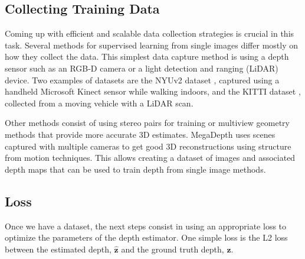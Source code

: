 \subsection{Collecting Training Data}

Coming up with efficient and scalable data collection strategies is crucial in this task. Several methods for supervised learning from single images differ mostly on how they collect the data. This simplest data capture method is using a depth sensor such as an RGB-D camera or a light detection and ranging (LiDAR) device.
Two examples of datasets are the NYUv2 dataset \cite{SilbermanECCV12}, captured using a handheld Microsoft Kinect sensor while walking indoors, and the KITTI dataset \cite{Geiger2013}, collected from a moving vehicle with a LiDAR scan.

Other methods consist of using stereo pairs for training \cite{Xian2018} or multiview geometry methods that provide more accurate 3D estimates. MegaDepth \cite{MegaDepthLi18} uses scenes captured with multiple cameras to get good 3D reconstructions using structure from motion techniques. This allows creating a dataset of images and associated depth maps that can be used to train depth from single image methods.


\subsection{Loss}

Once we have a dataset, the next steps consist in using an appropriate loss to optimize the parameters of the depth estimator. One simple loss is the L2 loss between the estimated depth, $\hat{\mathbf{z}}$ and the ground truth depth, $\mathbf{z}$.

